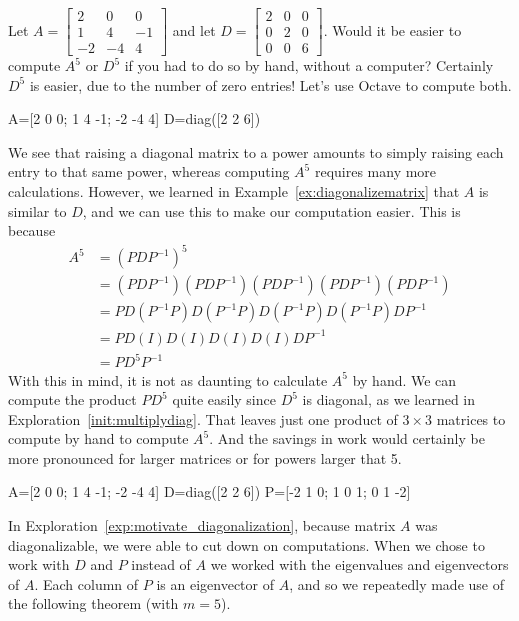 \documentclass{ximera}
\begin{document}
\begin{exploration}\label{exp:motivate_diagonalization}
Let $A=\begin{bmatrix}
2 & 0 & 0 \\
1 & 4 & -1 \\
-2 & -4 & 4
\end{bmatrix}$ and let $D=\begin{bmatrix}
2 & 0 & 0 \\
0 & 2 & 0 \\
0 & 0 & 6
\end{bmatrix}$.  
Would it be easier to compute $A^5$ or $D^5$ if you had to do so by hand, without a computer?  Certainly $D^5$ is easier, due to the number of zero entries!  Let's use Octave to compute both.

A=[2 0 0; 1 4 -1; -2 -4 4]
D=diag([2 2 6]) 

We see that raising a diagonal matrix to a power amounts to simply raising each entry to that same power, whereas computing $A^5$ requires many more calculations.  However, we learned in Example~\ref{ex:diagonalizematrix} that $A$ is similar to $D$, and we can use this to make our computation easier.  This is because
\begin{align*}
    A^5&=\left(PDP^{-1}\right)^5 \\
       &=(PDP^{-1})(PDP^{-1})(PDP^{-1})(PDP^{-1})(PDP^{-1}) \\
       &=PD(P^{-1}P)D(P^{-1}P)D(P^{-1}P)D(P^{-1}P)DP^{-1} \\
       &=PD(I)D(I)D(I)D(I)DP^{-1} \\
       &=PD^5P^{-1}
\end{align*}
With this in mind, it is not as daunting to calculate $A^5$ by hand.  We can compute the product $PD^5$ quite easily since $D^5$ is diagonal, as we learned in Exploration~\ref{init:multiplydiag}.  That leaves just one product of $3 \times 3$ matrices to compute by hand to compute $A^5$.  And the savings in work would certainly be more pronounced for larger matrices or for powers larger that 5.

A=[2 0 0; 1 4 -1; -2 -4 4]
D=diag([2 2 6])
P=[-2 1 0; 1 0 1; 0 1 -2]
\end{exploration}  

In Exploration~\ref{exp:motivate_diagonalization}, because matrix $A$ was diagonalizable, we were able to cut down on computations.  When we chose to work with $D$ and $P$ instead of $A$ we worked with the eigenvalues and eigenvectors of $A$.  Each column of $P$ is an eigenvector of $A$, and so we repeatedly made use of the following theorem (with $m=5$).
\end{document}
